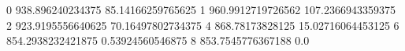 0 938.896240234375 85.14166259765625
1 960.9912719726562 107.2366943359375
2 923.9195556640625 70.16497802734375
4 868.78173828125 15.02716064453125
6 854.2938232421875 0.53924560546875
8 853.7545776367188 0.0
